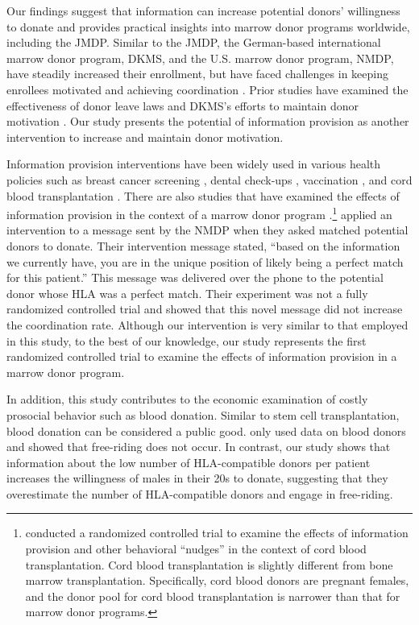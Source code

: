 \documentclass[12pt, a4paper]{article}
\begin{document}
Our findings suggest that information can increase potential donors' willingness to donate and provides practical insights into marrow donor programs worldwide, including the JMDP. Similar to the JMDP, the German-based international marrow donor program, DKMS, and the U.S. marrow donor program, NMDP, have steadily increased their enrollment, but have faced challenges in keeping enrollees motivated and achieving coordination \citep{Switzer1999, Switzer2004, Haylock2024}. Prior studies have examined the effectiveness of donor leave laws \citep{Lacetera2014} and DKMS's efforts to maintain donor motivation \citep{Haylock2024}. Our study presents the potential of information provision as another intervention to increase and maintain donor motivation.

Information provision interventions have been widely used in various health policies such as breast cancer screening \citep{Bertoni2020}, dental check-ups \citep{Altmann2014}, vaccination \citep[e.g.,][]{Dai2021, Milkman2021}, and cord blood transplantation \citep{Grieco2018}. There are also studies that have examined the effects of information provision in the context of a marrow donor program \citep{Switzer2018}.\footnote{\citet{Grieco2018} conducted a randomized controlled trial to examine the effects of information provision and other behavioral ``nudges'' in the context of cord blood transplantation. Cord blood transplantation is slightly different from bone marrow transplantation. Specifically, cord blood donors are pregnant females, and the donor pool for cord blood transplantation is narrower than that for marrow donor programs.} \citet{Switzer2018} applied an intervention to a message sent by the NMDP when they asked matched potential donors to donate. Their intervention message stated, ``based on the information we currently have, you are in the unique position of likely being a perfect match for this patient.'' This message was delivered over the phone to the potential donor whose HLA was a perfect match. Their experiment was not a fully randomized controlled trial and showed that this novel message did not increase the coordination rate. Although our intervention is very similar to that employed in this study, to the best of our knowledge, our study represents the first randomized controlled trial to examine the effects of information provision in a marrow donor program.

In addition, this study contributes to the economic examination of costly prosocial behavior such as blood donation. Similar to stem cell transplantation, blood donation can be considered a public good. \citet{Wildman2009} only used data on blood donors and showed that free-riding does not occur. In contrast, our study shows that information about the low number of HLA-compatible donors per patient increases the willingness of males in their 20s to donate, suggesting that they overestimate the number of HLA-compatible donors and engage in free-riding.
\end{document}
